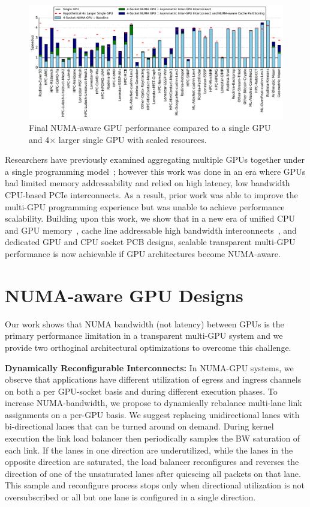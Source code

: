 \documentclass{sig-alternate}
\begin{document}
\begin{figure}[!t]
	\centering
	\includegraphics[width=1.0\textwidth]{figures/plot_final_speedup_WB_nvlink_first.pdf}
	\caption{Final NUMA-aware GPU performance compared to a single GPU and 4$\times$ 
	larger single GPU with scaled resources.}
	\vspace{-0.225in}
	\label{fig:combined}
\end{figure}

Researchers have previously examined aggregating multiple GPUs together under a single 
programming model~\cite{lee2013transparent,Cabezas2015}; however this work was 
done in an era where GPUs had limited memory addressability and relied on high 
latency, low bandwidth CPU-based PCIe interconnects. As a result, prior work 
was able to improve the multi-GPU programming experience but was unable to achieve
performance scalability. Building upon this work, we show that in a new
era of unified CPU and GPU memory~\cite{UVM}, cache line addressable high 
bandwidth interconnects~\cite{NVLINK}, and dedicated GPU and CPU socket PCB 
designs, scalable transparent multi-GPU performance is now achievable if GPU
architectures become NUMA-aware.

\vspace{-.05in}
\section{NUMA-aware GPU Designs}

Our work shows that NUMA bandwidth (not latency) between GPUs is the primary
performance limitation in a transparent multi-GPU system and we provide two orthoginal
architectural optimizations to overcome this challenge.

\textbf{Dynamically Reconfigurable Interconnects:} In NUMA-GPU systems, we 
observe that applications have different utilization of egress and ingress 
channels on both a per GPU-socket basis and during different execution phases. 
To increase NUMA-bandwidth, we propose to dynamically rebalance multi-lane link assignments on a
per-GPU basis. We suggest replacing unidirectional lanes with bi-directional 
lanes that can be turned around on demand. During kernel 
execution the link load balancer then periodically samples the BW saturation of each 
link. If the lanes in one direction are underutilized, while the lanes in the 
opposite direction are saturated, the load balancer reconfigures and 
reverses the direction of one of the unsaturated lanes after quiescing all 
packets on that lane. This sample and reconfigure process stops only when 
directional utilization is not oversubscribed or all but one lane is configured 
in a single direction.
\end{document}
